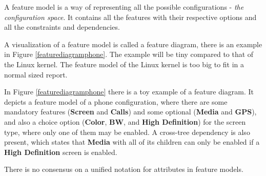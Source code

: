 \documentclass[a4paper,11pt]{report}
\begin{document}
A feature model is a way of representing all the possible configurations - 
\emph{the configuration space}. It contains all the features with their 
respective options and all the constraints and dependencies.

A visualization of a feature model is called a feature diagram, there is an 
example in Figure \ref{featurediagramphone}. The example 
will be tiny compared to that of the Linux kernel. The feature model of the 
Linux kernel is too big to fit in a normal sized report.

In Figure \ref{featurediagramphone} there is a toy example of a feature 
diagram. It depicts a feature model of a phone configuration, where there are 
some mandatory features (\textbf{Screen} and \textbf{Calls}) and some optional 
(\textbf{Media} and \textbf{GPS}), 
and also a choice option (\textbf{Color}, \textbf{BW}, and \textbf{High 
Definition}) for the screen type, where only one of them may be enabled. A 
cross-tree dependency is also present, which states that \textbf{Media} with 
all of its children can only be enabled if a \textbf{High Definition} screen is 
enabled.

There is no consensus on a unified notation for attributes in feature 
models\cite{AAFM}.
\end{document}
